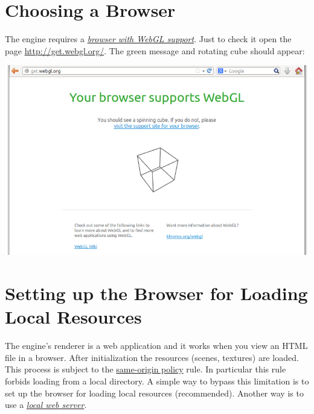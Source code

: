 \documentclass[a4paper,12pt,oneside]{sphinxmanual}
\begin{document}

\section{Choosing a Browser}
\label{setup:index-0}\label{setup:getting-started-browser}\label{setup:id3}
The engine requires a {\hyperref[about:browser-webgl-support]{\emph{browser with WebGL support}}}. Just to check it open the page \href{http://get.webgl.org/}{http://get.webgl.org/}. The green message and rotating cube should appear:

{\hfill\includegraphics[width=1.000\linewidth]{browser_supports_webgl.jpg}\hfill}

\begin{DUlineblock}{0em}
\item[] 
\end{DUlineblock}


\section{Setting up the Browser for Loading Local Resources}
\label{setup:browser-for-local-loading}\label{setup:id4}
The engine's renderer is a web application and it works when you view an HTML file in a browser. After initialization the resources (scenes, textures) are loaded. This process is subject to the \href{http://en.wikipedia.org/wiki/Same-origin\_policy}{same-origin policy} rule. In particular this rule forbids loading from a local directory. A simple way to bypass this limitation is to set up the browser for loading local resources (recommended). Another way is to use a {\hyperref[problems_and_solutions:local-web-server]{\emph{local web server}}}.
\end{document}
